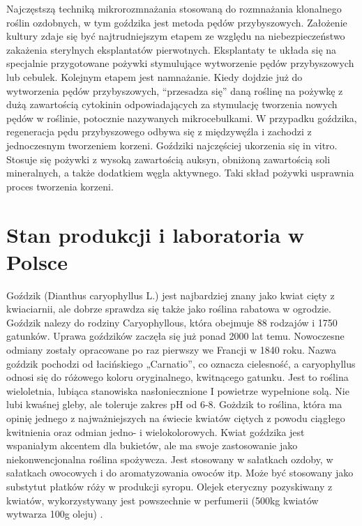 \documentclass[two column, twoside, a4paper]{article}
\begin{document}
Najczęstszą techniką mikrorozmnażania stosowaną do rozmnażania klonalnego roślin ozdobnych, w tym goździka jest metoda pędów przybyszowych. Założenie kultury zdaje się być najtrudniejszym etapem ze względu na niebezpieczeństwo zakażenia sterylnych eksplantatów pierwotnych. Eksplantaty te układa się na specjalnie przygotowane pożywki stymulujące wytworzenie pędów przybyszowych lub cebulek. Kolejnym etapem jest namnażanie. Kiedy dojdzie już do wytworzenia pędów przybyszowych, “przesadza się” daną roślinę na pożywkę z dużą zawartością cytokinin odpowiadających za stymulację tworzenia nowych pędów w roślinie, potocznie nazywanych mikrocebulkami. W przypadku goździka, regeneracja pędu przybyszowego odbywa się z międzywęźla i zachodzi z jednoczesnym tworzeniem korzeni.  Goździki najczęściej ukorzenia się in vitro. Stosuje się pożywki z wysoką zawartością auksyn, obniżoną zawartością soli mineralnych, a także dodatkiem węgla aktywnego. Taki skład pożywki usprawnia proces tworzenia korzeni.

\section{Stan produkcji i laboratoria w Polsce}

Goździk (Dianthus caryophyllus L.) jest najbardziej znany jako kwiat cięty
z kwiaciarnii, ale  dobrze sprawdza się także jako roślina rabatowa w ogrodzie. Goździk nalezy do rodziny Caryophyllous, która obejmuje  88 rodzajów i 1750 gatunków. Uprawa goździków zaczęła się już ponad 2000 lat temu. Nowoczesne odmiany zostały opracowane po raz pierwszy we Francji w 1840 roku. Nazwa goździk pochodzi od łacińskiego „Carnatio”, co oznacza cielesność, a caryophyllus odnosi się do różowego koloru oryginalnego, kwitnącego gatunku. Jest to roślina wieloletnia, lubiąca stanowiska nasłoniecznione I powietrze wypełnione solą. Nie lubi kwaśnej gleby, ale toleruje zakres pH od 6-8. Gożdzik to roślina, która ma opinię jednego z najważniejszych na świecie kwiatów ciętych z powodu ciągłego kwitnienia  oraz odmian jedno- i wielokolorowych.
Kwiat goździka jest wspaniałym akcentem dla bukietów, ale ma swoje zastosowanie  jako niekonwencjonalna roślina spożywcza. Jest stosowany w sałatkach ozdoby,
w sałatkach owocowych i do aromatyzowania owoców itp. Może być stosowany jako substytut płatków róży w produkcji syropu. Olejek eteryczny pozyskiwany  z kwiatów, wykorzystywany jest powszechnie w perfumerii (500kg kwiatów wytwarza 100g oleju) .
\end{document}

